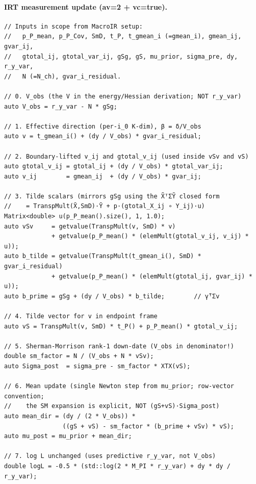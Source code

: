 \documentclass[11pt]{article}
\begin{document}
\paragraph{IRT measurement update (av=2 + vc=true).}
\begin{verbatim}
// Inputs in scope from MacroIR setup:
//   p_P_mean, p_P_Cov, SmD, t_P, t_gmean_i (=gmean_i), gmean_ij, gvar_ij,
//   gtotal_ij, gtotal_var_ij, gSg, gS, mu_prior, sigma_pre, dy, r_y_var,
//   N (=N_ch), gvar_i_residual.

// 0. V_obs (the V in the energy/Hessian derivation; NOT r_y_var)
auto V_obs = r_y_var - N * gSg;

// 1. Effective direction (per-i_0 K-dim), β = δ/V_obs
auto v = t_gmean_i() + (dy / V_obs) * gvar_i_residual;

// 2. Boundary-lifted v_ij and gtotal_v_ij (used inside vSv and vS)
auto gtotal_v_ij = gtotal_ij + (dy / V_obs) * gtotal_var_ij;
auto v_ij        = gmean_ij  + (dy / V_obs) * gvar_ij;

// 3. Tilde scalars (mirrors gSg using the X̃ᵀΣỸ closed form
//    = TranspMult(X̄,SmD)·Ȳ + p·(gtotal_X_ij ∘ Y_ij)·u)
Matrix<double> u(p_P_mean().size(), 1, 1.0);
auto vSv     = getvalue(TranspMult(v, SmD) * v)
             + getvalue(p_P_mean() * (elemMult(gtotal_v_ij, v_ij) * u));
auto b_tilde = getvalue(TranspMult(t_gmean_i(), SmD) * gvar_i_residual)
             + getvalue(p_P_mean() * (elemMult(gtotal_ij, gvar_ij) * u));
auto b_prime = gSg + (dy / V_obs) * b_tilde;        // γ̃ᵀΣv

// 4. Tilde vector for v in endpoint frame
auto vS = TranspMult(v, SmD) * t_P() + p_P_mean() * gtotal_v_ij;

// 5. Sherman-Morrison rank-1 down-date (V_obs in denominator!)
double sm_factor = N / (V_obs + N * vSv);
auto Sigma_post  = sigma_pre - sm_factor * XTX(vS);

// 6. Mean update (single Newton step from mu_prior; row-vector convention;
//    the SM expansion is explicit, NOT (gS+vS)·Sigma_post)
auto mean_dir = (dy / (2 * V_obs)) *
                ((gS + vS) - sm_factor * (b_prime + vSv) * vS);
auto mu_post = mu_prior + mean_dir;

// 7. log L unchanged (uses predictive r_y_var, not V_obs)
double logL = -0.5 * (std::log(2 * M_PI * r_y_var) + dy * dy / r_y_var);
\end{verbatim}
\end{document}
